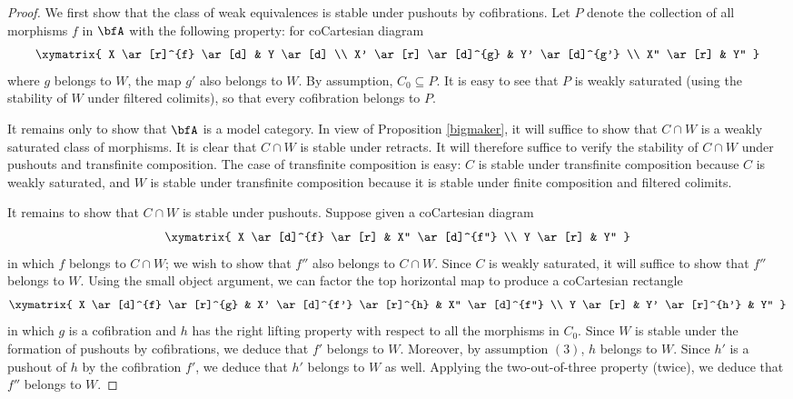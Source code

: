 \begin{proof}
We first show that the class of weak equivalences is stable under pushouts by cofibrations.
Let $P$ denote the collection of all morphisms $f$ in $\bfA$ with the following property:
for coCartesian diagram
$$ \xymatrix{ X \ar[r]^{f} \ar[d] & Y \ar[d] \\
	X' \ar[r] \ar[d]^{g} & Y' \ar[d]^{g'} \\
	X'' \ar[r] & Y'' } $$
where $g$ belongs to $W$, the map $g'$ also belongs to $W$. By assumption, 
$C_0 \subseteq P$. It is easy to see that $P$ is weakly saturated (using the stability of $W$ under filtered colimits), so that every cofibration belongs to $P$. 

It remains only to show that $\bfA$ is a model category. In view of Proposition \ref{bigmaker}, it will suffice to show that $C \cap W$ is a weakly saturated class of morphisms. It is clear that $C \cap W$ is stable under retracts. It will therefore suffice to verify the stability of $C \cap W$ under pushouts and transfinite composition. The case of transfinite composition is easy: $C$ is stable under transfinite composition because $C$ is weakly saturated, and $W$ is stable under transfinite composition because
it is stable under finite composition and filtered colimits.

It remains to show that $C \cap W$ is stable under pushouts. Suppose given a coCartesian diagram
$$ \xymatrix{ X \ar[d]^{f} \ar[r] & X'' \ar[d]^{f''} \\
Y \ar[r] & Y'' }$$
in which $f$ belongs to $C \cap W$; we wish to show that $f''$ also belongs to $C \cap W$. Since
$C$ is weakly saturated, it will suffice to show that $f''$ belongs to $W$. Using the small object argument, we can factor the top horizontal map to produce a coCartesian rectangle
$$ \xymatrix{ X \ar[d]^{f} \ar[r]^{g} & X' \ar[d]^{f'} \ar[r]^{h} & X'' \ar[d]^{f''} \\
Y \ar[r] & Y' \ar[r]^{h'} & Y'' }$$
in which $g$ is a cofibration and $h$ has the right lifting property with respect to all the morphisms in $C_0$. Since $W$ is stable under the formation of pushouts by cofibrations, we deduce that $f'$
belongs to $W$. Moreover, by assumption $(3)$, $h$ belongs to $W$. Since $h'$ is a pushout
of $h$ by the cofibration $f'$, we deduce that $h'$ belongs to $W$ as well. Applying the two-out-of-three property (twice), we deduce that $f''$ belongs to $W$. 
\end{proof}


